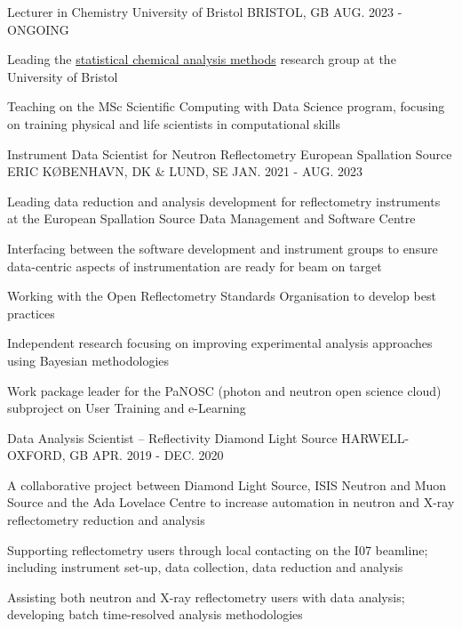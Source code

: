 \begin{cventries}
  \cventry
    {Lecturer in Chemistry}
    {University of Bristol}
    {BRISTOL, GB}
    {AUG. 2023 - ONGOING}
    {
      \begin{cvitems}
        \item {Leading the \href{https://scams-research.github.io}{statistical chemical analysis methods} research group at the University of Bristol}
        \item {Teaching on the MSc Scientific Computing with Data Science program, focusing on training physical and life scientists in computational skills}
      \end{cvitems}
    }
  \cventry
    {Instrument Data Scientist for Neutron Reflectometry}
    {European Spallation Source ERIC}
    {K\O BENHAVN, DK \& LUND, SE}
    {JAN. 2021 - AUG. 2023}
    {
      \begin{cvitems}
        \item {Leading data reduction and analysis development for reflectometry instruments at the European Spallation Source Data Management and Software Centre}
        \item {Interfacing between the software development and instrument groups to ensure data-centric aspects of instrumentation are ready for beam on target}
        \item {Working with the Open Reflectometry Standards Organisation to develop best practices}
        \item {Independent research focusing on improving experimental analysis approaches using Bayesian methodologies}
        \item {Work package leader for the PaNOSC (photon and neutron open science cloud) subproject on User Training and e-Learning}
      \end{cvitems}
    }
  \cventry
    {Data Analysis Scientist -- Reflectivity}
    {Diamond Light Source}
    {HARWELL-OXFORD, GB}
    {APR. 2019 - DEC. 2020}
    {
      \begin{cvitems}
        \item {A collaborative project between Diamond Light Source, ISIS Neutron and Muon Source and the Ada Lovelace Centre to increase automation in neutron and X-ray reflectometry reduction and analysis}
        \item {Supporting reflectometry users through local contacting on the I07 beamline; including instrument set-up, data collection, data reduction and analysis}
        \item {Assisting both neutron and X-ray reflectometry users with data analysis; developing batch time-resolved analysis methodologies}
      \end{cvitems}
    }
\end{cventries}
